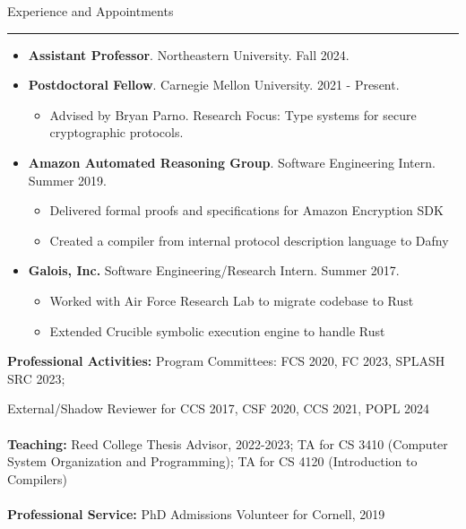 \documentclass{article}
\newcommand{\rsection}[1]{\vspace{1em} {\huge #1} \vspace{0.5em} \hrule \vspace{1em}}
\begin{document}
\rsection{Experience and Appointments}
\begin{itemize}
    \item {\bf Assistant Professor}. Northeastern University. Fall 2024. 

    \item {\bf Postdoctoral Fellow}. Carnegie Mellon University. 2021 - Present.
        \begin{itemize}
            \item Advised by Bryan Parno. Research Focus: Type systems for secure cryptographic protocols. 
        \end{itemize}

    \item {\bf Amazon Automated Reasoning Group}. Software Engineering Intern.
        Summer 2019.
        \begin{itemize}
            \item Delivered formal proofs and specifications for Amazon Encryption SDK
            \item Created a compiler from internal protocol description language to Dafny
        \end{itemize}

    \item {\bf Galois, Inc.} Software Engineering/Research Intern. Summer 2017.
        \begin{itemize}
            \item Worked with Air Force Research Lab to migrate codebase to Rust
            \item Extended Crucible symbolic execution engine to handle Rust
        \end{itemize}
\end{itemize}
    {\bf Professional Activities:} Program Committees: FCS 2020, FC 2023, SPLASH
    SRC 2023; 

    External/Shadow Reviewer for CCS 2017, CSF 2020, CCS 2021, POPL 2024
    \\
    \\
    {\bf Teaching:} Reed College Thesis Advisor, 2022-2023; TA for CS 3410
    (Computer System Organization and Programming); TA for CS 4120 (Introduction
    to Compilers)
    \\
    \\
    {\bf Professional Service:} PhD Admissions Volunteer for Cornell, 2019
\end{document}
